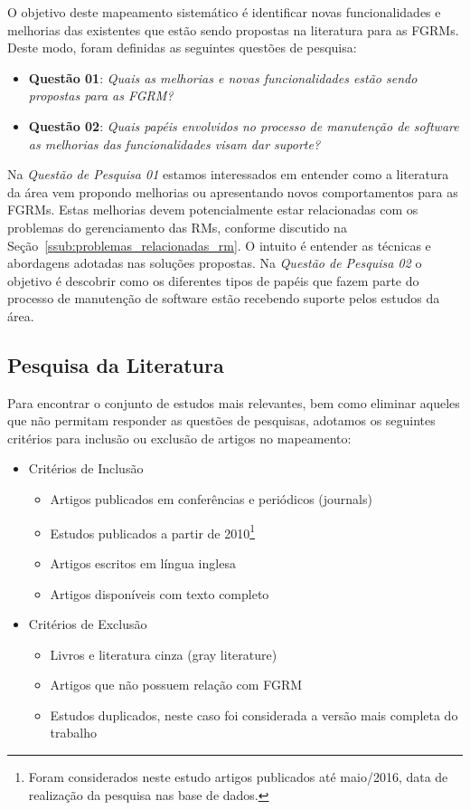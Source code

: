 O objetivo deste mapeamento sistemático é identificar novas funcionalidades e
melhorias das existentes que estão sendo propostas na literatura para as FGRMs.
Deste modo, foram definidas as seguintes questões de pesquisa:

\begin{itemize}
	\item \textbf{Questão 01}: \textit{Quais as melhorias e novas
			funcionalidades estão sendo propostas para as FGRM?}
	\item \textbf{Questão 02}: \textit{Quais papéis envolvidos no processo de
			manutenção de software as melhorias das funcionalidades visam dar
			suporte?}
\end{itemize}

Na \textit{Questão de Pesquisa 01} estamos interessados em entender como a
literatura da área vem propondo melhorias ou apresentando novos comportamentos
para as FGRMs. Estas melhorias devem potencialmente estar relacionadas com os
problemas do gerenciamento das RMs, conforme discutido na
Seção~\ref{ssub:problemas_relacionadas_rm}. O intuito é entender as técnicas e
abordagens adotadas nas soluções propostas. Na \textit{Questão de Pesquisa 02} o
objetivo é descobrir como os diferentes tipos de papéis que fazem parte do
processo de manutenção de software estão recebendo suporte pelos estudos da
área.

\subsection{Pesquisa da Literatura}
\label{subsec:map-pesquisa-literatura}

Para encontrar o conjunto de estudos mais relevantes, bem como eliminar aqueles
que não permitam responder as questões de pesquisas, adotamos os seguintes
critérios para inclusão ou exclusão de artigos no mapeamento:

\begin{itemize}
	\item Critérios de Inclusão
		\begin{itemize}
			\item Artigos
				publicados em conferências e periódicos (journals)
			\item Estudos
				publicados a partir de 2010\footnote{Foram considerados neste
					estudo artigos publicados até maio/2016, data de realização
					da pesquisa nas base de dados.}
			\item Artigos escritos em
				língua inglesa
			\item Artigos disponíveis com texto
				completo
		\end{itemize}
	\item Critérios de Exclusão
		\begin{itemize}
			\item Livros e literatura cinza (gray literature)
			\item Artigos que não possuem relação com FGRM
			\item Estudos duplicados, neste caso foi considerada a versão mais
				completa do trabalho
		\end{itemize}
\end{itemize}

